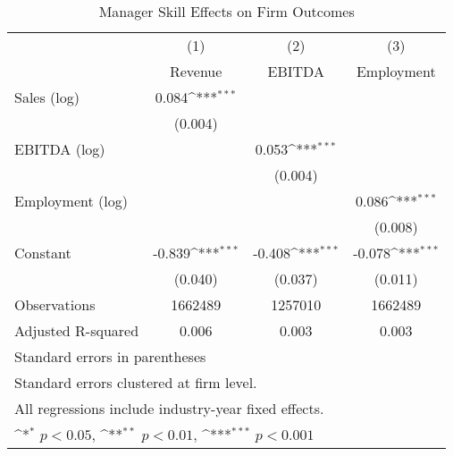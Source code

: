 \begin{table}[htbp]\centering
\def\sym#1{\ifmmode^{#1}\else\(^{#1}\)\fi}
\caption{Manager Skill Effects on Firm Outcomes}
\begin{tabular}{l*{3}{c}}
\toprule
                    &\multicolumn{1}{c}{(1)}&\multicolumn{1}{c}{(2)}&\multicolumn{1}{c}{(3)}\\
                    &\multicolumn{1}{c}{Revenue}&\multicolumn{1}{c}{EBITDA}&\multicolumn{1}{c}{Employment}\\
\midrule
Sales (log)         &       0.084\sym{***}&                     &                     \\
                    &     (0.004)         &                     &                     \\
\addlinespace
EBITDA (log)        &                     &       0.053\sym{***}&                     \\
                    &                     &     (0.004)         &                     \\
\addlinespace
Employment (log)    &                     &                     &       0.086\sym{***}\\
                    &                     &                     &     (0.008)         \\
\addlinespace
Constant            &      -0.839\sym{***}&      -0.408\sym{***}&      -0.078\sym{***}\\
                    &     (0.040)         &     (0.037)         &     (0.011)         \\
\midrule
Observations        &     1662489         &     1257010         &     1662489         \\
Adjusted R-squared  &       0.006         &       0.003         &       0.003         \\
\bottomrule
\multicolumn{4}{l}{\footnotesize Standard errors in parentheses}\\
\multicolumn{4}{l}{\footnotesize Standard errors clustered at firm level.}\\
\multicolumn{4}{l}{\footnotesize All regressions include industry-year fixed effects.}\\
\multicolumn{4}{l}{\footnotesize \sym{*} \(p<0.05\), \sym{**} \(p<0.01\), \sym{***} \(p<0.001\)}\\
\end{tabular}
\end{table}
